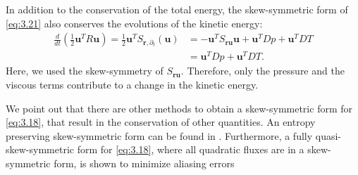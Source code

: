 In addition to the conservation of the total energy, the skew-symmetric form of \eqref{eq:3.21} also conserves the evolutions of the kinetic energy:
\begin{equation} \label{eq:3.26}
\begin{aligned}
	\frac{d}{dt} ( \frac 1 2 \mathbf u^T R\mathbf u) = \frac 1 2 \mathbf u^T S_{\mathbf r,\partial_t} (\mathbf u) &= -\mathbf u ^T S_{\mathbf r \mathbf u} \mathbf u + \mathbf u^T D p + \mathbf u^T DT \\
	&= \mathbf u^T D p + \mathbf u^T DT.
\end{aligned}
\end{equation}
Here, we used the skew-symmetry of $S_{\mathbf r \mathbf u}$. Therefore, only the pressure and the viscous terms contribute to a change in the kinetic energy.

We point out that there are other methods to obtain a skew-symmetric form for \eqref{eq:3.18}, that result in the conservation of other quantities. An entropy preserving skew-symmetric form can be found in \cite{sjogreen2010skew}. Furthermore, a fully quasi-skew-symmetric form for \eqref{eq:3.18}, where all quadratic fluxes are in a skew-symmetric form, is shown to minimize aliasing errors \cite{honein2004higher,honein2005numerical}

